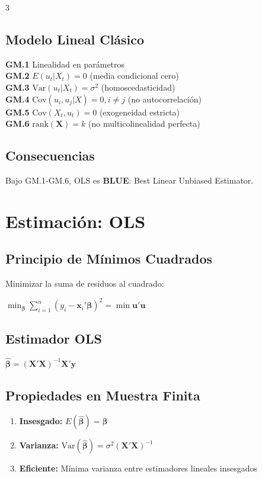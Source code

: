 \documentclass[9pt, spanish, twoside]{article}
\newcommand{\techfont}{\fontfamily{phv}\selectfont}
\newcommand{\eqbox}[1]{\colorbox{TitaniumGray}{$\displaystyle #1$}}
\begin{document}
\begin{multicols*}{3}
\subsection{Modelo Lineal Clásico}
\begin{tcolorbox}[colback=TitaniumGray, colframe=VogueBlack, arc=0pt, boxrule=0.3pt, title=\techfont \tiny SUPUESTOS GAUSS-MARKOV, fonttitle=\tiny\bfseries]
\scriptsize
\textbf{GM.1} Linealidad en parámetros \\
\textbf{GM.2} $E(u_t|X_t) = 0$ (media condicional cero) \\
\textbf{GM.3} $\text{Var}(u_t|X_t) = \sigma^2$ (homoscedasticidad) \\
\textbf{GM.4} $\text{Cov}(u_i, u_j|X) = 0, i \neq j$ (no autocorrelación) \\
\textbf{GM.5} $\text{Cov}(X_t, u_t) = 0$ (exogeneidad estricta) \\
\textbf{GM.6} $\text{rank}(\mathbf{X}) = k$ (no multicolinealidad perfecta)
\end{tcolorbox}

\subsection{Consecuencias}
Bajo GM.1-GM.6, OLS es \textbf{BLUE}: Best Linear Unbiased Estimator.

\section{Estimación: OLS}
\subsection{Principio de Mínimos Cuadrados}
Minimizar la suma de residuos al cuadrado:

\vspace{2pt}
$\min_{\boldsymbol{\beta}} \sum_{i=1}^{n}(y_i - \mathbf{x}_i'\boldsymbol{\beta})^2 = \min \mathbf{u}'\mathbf{u}$
\vspace{2pt}

\subsection{Estimador OLS}
\vspace{2pt}
\eqbox{\hat{\boldsymbol{\beta}} = (\mathbf{X}'\mathbf{X})^{-1}\mathbf{X}'\mathbf{y}}
\vspace{2pt}

\subsection{Propiedades en Muestra Finita}
\begin{enumerate}[leftmargin=8pt, noitemsep, topsep=2pt]
    \item \textbf{Insesgado:} $E(\hat{\boldsymbol{\beta}}) = \boldsymbol{\beta}$
    \item \textbf{Varianza:} $\text{Var}(\hat{\boldsymbol{\beta}}) = \sigma^2(\mathbf{X}'\mathbf{X})^{-1}$
    \item \textbf{Eficiente:} Mínima varianza entre estimadores lineales insesgados
\end{enumerate}


\end{multicols*}
\end{document}
